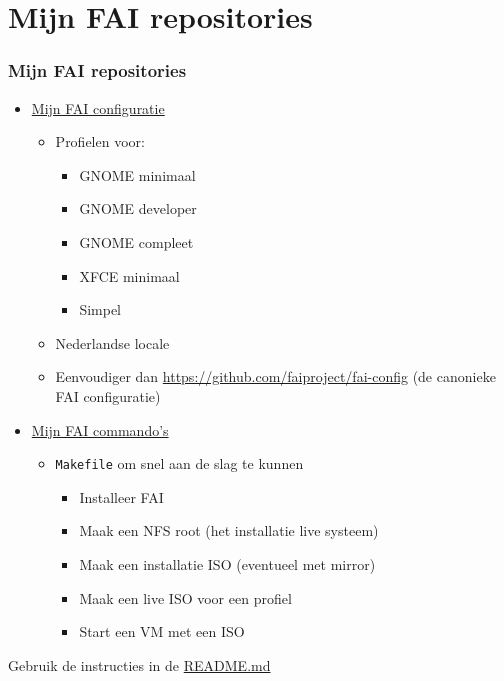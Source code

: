 \documentclass{beamer}
\begin{document}
\section{Mijn FAI repositories}
\begin{frame}
\frametitle{Mijn FAI repositories}
\begin{itemize}
  \item \href{https://github.com/slspeek/fai/}{Mijn FAI configuratie}
  \begin{itemize}
    \item Profielen voor:
    \begin{itemize}
      \item GNOME minimaal
      \item GNOME developer
      \item GNOME compleet
      \item XFCE minimaal
      \item Simpel
    \end{itemize}
    \item Nederlandse locale
    \item Eenvoudiger dan \url{https://github.com/faiproject/fai-config} (de canonieke FAI configuratie)
  \end{itemize}
  \item \href{https://github.com/slspeek/fai-cmds/}{Mijn FAI commando's}
  \begin{itemize}
    \item \texttt{Makefile} om snel aan de slag te kunnen
    \begin{itemize}
      \item Installeer FAI
      \item Maak een NFS root (het installatie live systeem)
      \item Maak een installatie ISO (eventueel met mirror)
      \item Maak een live ISO voor een profiel
      \item Start een VM met een ISO
    \end{itemize}
  \end{itemize}
\end{itemize}
Gebruik de instructies in de \href{https://github.com/slspeek/fai-cmds/blob/main/README.md}{README.md}
\end{frame}
\end{document}

